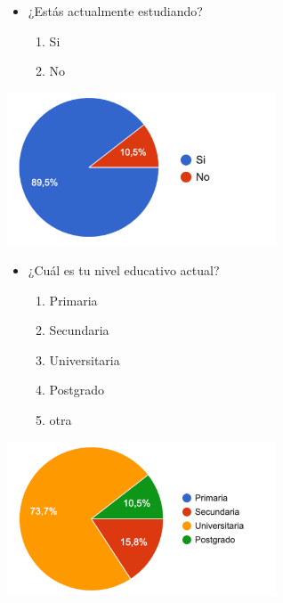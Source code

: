 \documentclass[
]{article}
\providecommand{\tightlist}{%
  \setlength{\itemsep}{0pt}\setlength{\parskip}{0pt}}
\begin{document}
\vspace{10mm}

\begin{itemize}
\tightlist
\item
  ¿Estás actualmente estudiando?

  \begin{enumerate}
  \def\labelenumi{\alph{enumi}.}
  \tightlist
  \item
    Si
  \item
    No
  \end{enumerate}
\end{itemize}

\includegraphics[width=0.6\textwidth,height=\textheight]{img/estudiando.png}

\newpage

\begin{itemize}
\tightlist
\item
  ¿Cuál es tu nivel educativo actual?

  \begin{enumerate}
  \def\labelenumi{\alph{enumi}.}
  \tightlist
  \item
    Primaria
  \item
    Secundaria
  \item
    Universitaria
  \item
    Postgrado
  \item
    otra
  \end{enumerate}
\end{itemize}

\includegraphics[width=0.6\textwidth,height=\textheight]{img/nivel.png}
\end{document}
